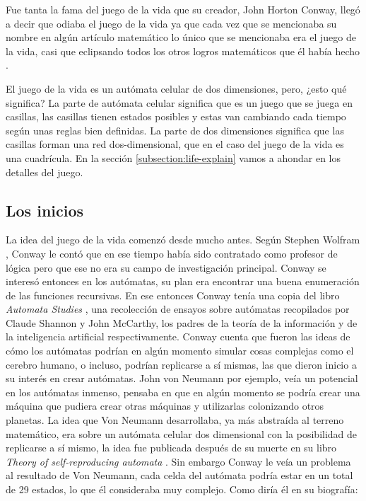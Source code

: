 Fue tanta la fama del juego de la vida que su creador, John Horton Conway, lleg\'o a decir que odiaba el juego de la vida ya que cada vez que se mencionaba su nombre en algún art\'iculo matem\'atico lo \'unico que se mencionaba era el juego de la vida, casi que eclipsando todos los otros logros matem\'aticos que \'el hab\'ia hecho \cite{YTNumberphileConway}.

El juego de la vida es un aut\'omata celular de dos dimensiones, pero, ¿esto qu\'e significa? La parte de aut\'omata celular significa que es un juego que se juega en casillas, las casillas tienen estados posibles y estas van cambiando cada tiempo seg\'un unas reglas bien definidas. La parte de dos dimensiones significa que las casillas forman una red dos-dimensional, que en el caso del juego de la vida es una cuadr\'icula. En la secci\'on \ref{subsection:life-explain} vamos a ahondar en los detalles del juego.
\subsection{Los inicios}

La idea del juego de la vida comenz\'o desde mucho antes. Seg\'un Stephen Wolfram \cite{MathematicalArtist2022}, Conway le cont\'o que en ese tiempo hab\'ia sido contratado como profesor de l\'ogica pero que ese no era su campo de investigaci\'on principal. Conway se interes\'o entonces en los aut\'omatas, su plan era encontrar una buena enumeraci\'on de las funciones recursivas. En ese entonces Conway ten\'ia una copia del libro \textit{Automata Studies} \cite{Shannon1956}, una recolecci\'on de ensayos sobre aut\'omatas recopilados por Claude Shannon y John McCarthy, los padres de la teor\'ia de la informaci\'on y de la inteligencia artificial respectivamente. Conway cuenta que fueron las ideas de c\'omo los aut\'omatas podr\'ian en alg\'un momento simular cosas complejas como el cerebro humano, o incluso, podr\'ian replicarse a s\'i mismas, las que dieron inicio a su inter\'es en crear aut\'omatas. John von Neumann por ejemplo, ve\'ia un potencial en los aut\'omatas inmenso, pensaba en que en alg\'un momento se podr\'ia crear una m\'aquina que pudiera crear otras m\'aquinas y utilizarlas colonizando otros planetas. La idea que Von Neumann desarrollaba, ya m\'as abstra\'ida al terreno matem\'atico, era sobre un aut\'omata celular dos dimensional con la posibilidad de replicarse a s\'i mismo, la idea fue publicada despu\'es de su muerte en su libro \textit{Theory of self-reproducing automata} \cite{Von_Neumann1967-ma}. Sin embargo Conway le ve\'ia un problema al resultado de Von Neumann, cada celda del aut\'omata podr\'ia estar en un total de 29 estados, lo que \'el consideraba muy complejo. Como dir\'ia \'el en su biograf\'ia:


